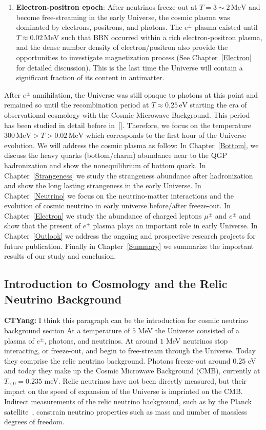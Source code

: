 \begin{enumerate}
 \item \textbf{Electron-positron epoch}: After neutrinos freeze-out at $T=3\sim2\,\mathrm{MeV}$ and become free-streaming in the early Universe, the cosmic plasma was dominated by electrons, positrons, and photons. The $e^\pm$ plasma existed until $T\approx0.02\,\mathrm{MeV}$ such that BBN occurred within a rich electron-positron plasma, and the dense number density of electron/positron also provide the opportunities to investigate magnetization process (See Chapter~\ref{Electron} for detailed discussion). This is the last time the Universe will contain a significant fraction of its content in antimatter.
\end{enumerate}
After $e^\pm$ annihilation, the Universe was still opaque to photons at this point and remained so until the recombination period at $T\approx0.25\,\mathrm{eV}$ starting the era of observational cosmology with the Cosmic Microwave Background. This period has been studied in detail before in~[\cite{Planck:2018vyg}]. Therefore, we focus on the temperature $300\,\mathrm{MeV}>T>0.02\,\mathrm{MeV}$ which corresponds to the first hour of the Universe evolution. We will address the cosmic plasma as follow: In Chapter~\ref{Bottom}, we discuss the heavy quarks (bottom/charm) abundance near to the QGP hadronization and show the nonequilibrium of bottom quark. In Chapter~\ref{Strangeness} we study the strangeness abundance after hadronization and show the long lasting strangeness in the early Universe. In Chapter~\ref{Neutrino} we focus on the neutrino-matter interactions and the evolution of cosmic neutrino in early universe before/after freeze-out. In Chapter~\ref{Electron} we study the abundance of charged leptons $\mu^\pm$ and $e^\pm$ and show that the present of $e^\pm$ plasma plays an important role in early Universe. In Chapter~\ref{Outlook} we address the ongoing and prospective research projects for future publication.
Finally in Chapter~\ref{Summary} we summarize the important results of our study and conclusion.

\subsection{Introduction to Cosmology and the Relic Neutrino Background}\label{ch:intro}
{\color{blue}\textbf{CTYang:} I think this paragraph can be the introduction for cosmic neutrino background section}
At a temperature of $5$ MeV the Universe consisted of a plasma of $e^\pm$, photons, and neutrinos. At around $1$ MeV neutrinos stop interacting, or freeze-out, and begin to free-stream through the Universe. Today they comprise the relic neutrino background. Photons freeze-out around $0.25$ eV and today they make up the Cosmic Microwave Background (CMB), currently at $T_{\gamma,0}=0.235$ meV. Relic neutrinos have not been directly measured, but their impact on the speed of expansion of the Universe is imprinted on the CMB. Indirect measurements of the relic neutrino background, such as by the Planck satellite~\cite{Planck}, constrain neutrino properties such as mass and number of massless degrees of freedom.

